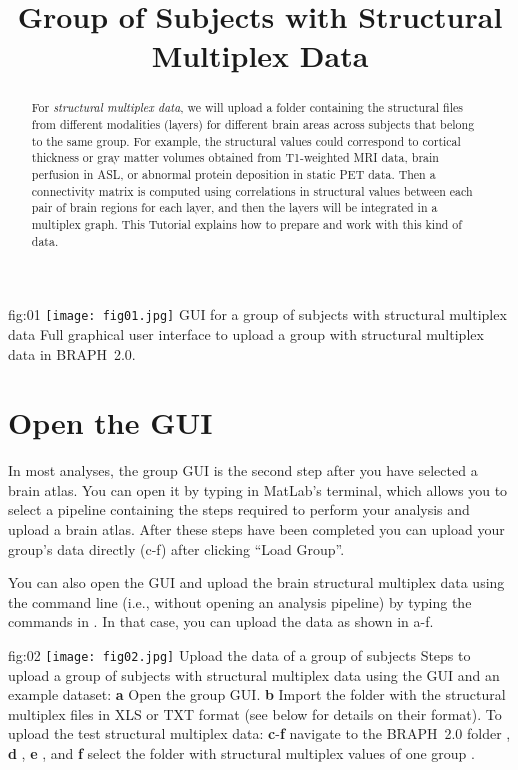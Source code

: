 \documentclass[justified]{tufte-handout}
\title{Group of Subjects with Structural Multiplex Data}
\begin{document}
\maketitle

\begin{abstract}
\noindent
For \emph{structural multiplex data}, we will upload a folder containing the structural files from different modalities (layers) for different brain areas across subjects that belong to the same group. For example, the structural values could correspond to cortical thickness or gray matter volumes obtained from T1-weighted MRI data, brain perfusion in ASL, or abnormal protein deposition in static PET data. Then a connectivity matrix is computed using correlations in structural values between each pair of brain regions for each layer, and then the layers will be integrated in a multiplex graph. This Tutorial explains how to prepare and work with this kind of data.
\end{abstract}

\tableofcontents

	{fig:01}
	{\texttt{[image: fig01.jpg]}}
	{GUI for a group of subjects with structural multiplex data}
	{
	Full graphical user interface to upload a group with structural multiplex data in BRAPH~2.0. 
	}

\clearpage
\section{Open the GUI}

In most analyses, the group GUI is the second step after you have selected a brain atlas. You can open it by typing  in MatLab's terminal, which allows you to select a pipeline containing the steps required to perform your analysis and upload a brain atlas. After these steps have been completed you can upload your group's data directly (c-f) after clicking ``Load Group''. 

You can also open the GUI and upload the brain structural multiplex data using the command line (i.e., without opening an analysis pipeline) by typing the commands in . In that case, you can upload the data as shown in a-f.

	{fig:02}
	{
	\texttt{[image: fig02.jpg]}
	}
	{Upload the data of a group of subjects}
	{
	Steps to upload a group of subjects with structural multiplex data using the GUI and an example dataset: 
	{\bf a} Open the group GUI.
	{\bf b} Import the folder with the structural multiplex files in XLS or TXT format (see below for details on their format).
	To upload the test structural multiplex data:
	{\bf c}-{\bf f} navigate to the BRAPH~2.0 folder , {\bf d} ,  {\bf e} , and {\bf f} select the folder with structural multiplex values of one group .
	}
\end{document}
